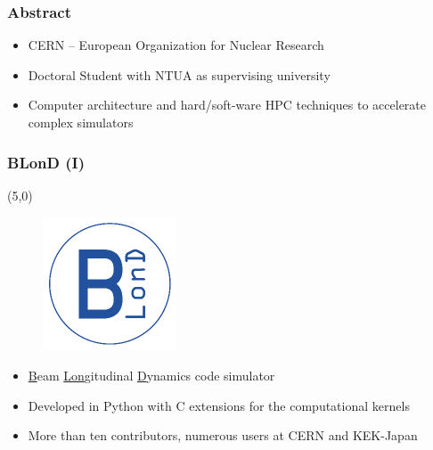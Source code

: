 

\begin{frame}
	\frametitle{Abstract}
	\begin{itemize}
		\item CERN -- European Organization for Nuclear Research
		\item Doctoral Student with NTUA as supervising university
		\item Computer architecture and hard/soft-ware HPC techniques to 
		accelerate complex simulators
	\end{itemize}
\end{frame}


\begin{frame}
	\frametitle{BLonD (I)}
	\begin{textblock}{2}(5,0)
		\begin{figure}
			\includegraphics[width=\textwidth]{figures/BLonD_logo_header}
		\end{figure}
	\end{textblock}
	\begin{itemize}
		\item \underline{B}eam \underline{Lon}gitudinal \underline{D}ynamics code simulator
		\item Developed in Python with C extensions for the computational kernels
		\item More than ten contributors, numerous users at CERN and KEK-Japan
	\end{itemize}
\end{frame}

